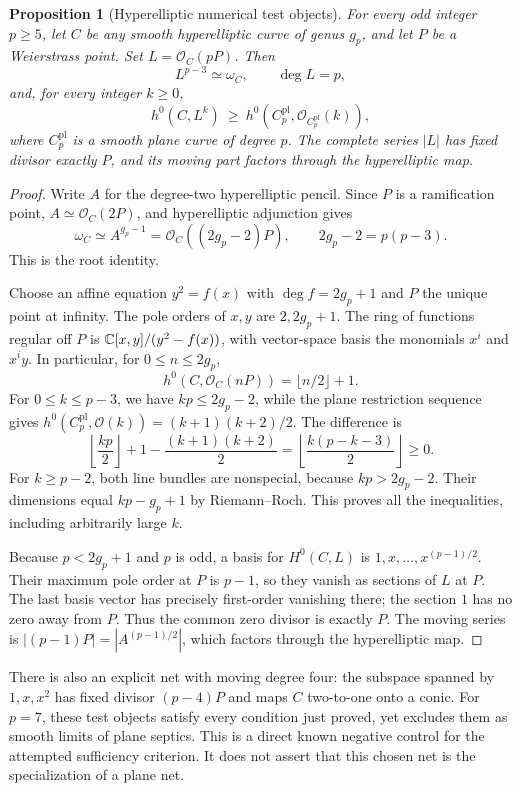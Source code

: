 \documentclass[11pt]{article}
\newtheorem{proposition}[theorem]{Proposition}
\theoremstyle{remark}\newtheorem{remark}[theorem]{Remark}
\newcommand{\OO}{\mathcal O}\newcommand{\Cl}{\operatorname{Cl}}\newcommand{\Pic}{\operatorname{Pic}}
\begin{document}
\begin{proposition}[Hyperelliptic numerical test objects]\label{prop:hyper}
For every odd integer $p\geq5$, let $C$ be any smooth hyperelliptic curve of genus $g_p$, and let $P$ be a Weierstrass point. Set $L=\OO_C(pP)$. Then
\[
 L^{p-3}\simeq\omega_C,\qquad \deg L=p,
\]
and, for every integer $k\geq0$,
\[
 h^0(C,L^k)\ \geq\ h^0(C^{\mathrm{pl}}_p,\OO_{C^{\mathrm{pl}}_p}(k)),
\]
where $C^{\mathrm{pl}}_p$ is a smooth plane curve of degree $p$.
The complete series $|L|$ has fixed divisor exactly $P$, and its moving part factors through the hyperelliptic map.
\end{proposition}
\begin{proof}
Write $A$ for the degree-two hyperelliptic pencil. Since $P$ is a ramification point, $A\simeq\OO_C(2P)$, and hyperelliptic adjunction gives
\[
 \omega_C\simeq A^{g_p-1}=\OO_C((2g_p-2)P),\qquad
 2g_p-2=p(p-3).
\]
This is the root identity.

Choose an affine equation $y^2=f(x)$ with $\deg f=2g_p+1$ and $P$ the unique point at infinity. The pole orders of $x,y$ are $2,2g_p+1$. The ring of functions regular off $P$ is $\mathbb C[x,y]/(y^2-f(x))$, with vector-space basis the monomials $x^i$ and $x^iy$. In particular, for $0\leq n\leq2g_p$,
\[
 h^0(C,\OO_C(nP))=\lfloor n/2\rfloor+1.
\]
For $0\leq k\leq p-3$, we have $kp\leq2g_p-2$, while the plane restriction sequence gives $h^0(C_p^{\mathrm{pl}},\OO(k))=(k+1)(k+2)/2$. The difference is
\[
 \left\lfloor\frac{kp}{2}\right\rfloor+1-\frac{(k+1)(k+2)}2
 =\left\lfloor\frac{k(p-k-3)}2\right\rfloor\geq0.
\]
For $k\geq p-2$, both line bundles are nonspecial, because $kp>2g_p-2$. Their dimensions equal $kp-g_p+1$ by Riemann--Roch. This proves all the inequalities, including arbitrarily large $k$.

Because $p<2g_p+1$ and $p$ is odd, a basis for $H^0(C,L)$ is
$1,x,\ldots,x^{(p-1)/2}$. Their maximum pole order at $P$ is $p-1$, so they vanish as sections of $L$ at $P$. The last basis vector has precisely first-order vanishing there; the section $1$ has no zero away from $P$. Thus the common zero divisor is exactly $P$. The moving series is $|(p-1)P|=|A^{(p-1)/2}|$, which factors through the hyperelliptic map.
\end{proof}

There is also an explicit net with moving degree four: the subspace spanned by $1,x,x^2$ has fixed divisor $(p-4)P$ and maps $C$ two-to-one onto a conic. For $p=7$, these test objects satisfy every condition just proved, yet \cite[Thm.~E]{DS} excludes them as smooth limits of plane septics. This is a direct known negative control for the attempted sufficiency criterion. It does not assert that this chosen net is the specialization of a plane net.
\end{document}

